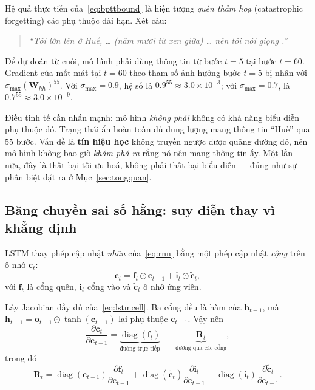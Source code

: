 Hệ quả thực tiễn của~\eqref{eq:bpttbound} là hiện tượng \emph{quên thảm hoạ}
(catastrophic forgetting) các phụ thuộc dài hạn. Xét câu:

\begin{quote}
\itshape
``Tôi lớn lên ở Huế, \ldots{} (năm mươi từ xen giữa) \ldots{} nên tôi nói giọng
\underline{\phantom{Huế}}.''
\end{quote}

Để dự đoán từ cuối, mô hình phải dùng thông tin từ bước $t=5$ tại bước $t=60$.
Gradient của mất mát tại $t=60$ theo tham số ảnh hưởng bước $t=5$ bị nhân với
$\sigma_{\max}(\mathbf{W}_{hh})^{55}$. Với $\sigma_{\max} = 0.9$, hệ số là
$0.9^{55}\approx 3.0\times10^{-3}$; với $\sigma_{\max} = 0.7$, là
$0.7^{55}\approx 3.0\times10^{-9}$.

Điều tinh tế cần nhấn mạnh: mô hình \emph{không phải} không có khả năng biểu diễn
phụ thuộc đó. Trạng thái ẩn hoàn toàn đủ dung lượng mang thông tin ``Huế'' qua
$55$ bước. Vấn đề là \textbf{tín hiệu học} không truyền ngược được quãng đường đó,
nên mô hình không bao giờ \emph{khám phá ra} rằng nó nên mang thông tin ấy. Một
lần nữa, đây là thất bại tối ưu hoá, không phải thất bại biểu diễn --- đúng như
sự phân biệt đặt ra ở Mục~\ref{sec:tongquan}.

\subsection{Băng chuyền sai số hằng: suy diễn thay vì khẳng định}

LSTM thay phép cập nhật \emph{nhân} của~\eqref{eq:rnn} bằng một phép cập nhật
\emph{cộng} trên ô nhớ $\mathbf{c}_t$:
\begin{equation}
  \mathbf{c}_t
  = \mathbf{f}_t \odot \mathbf{c}_{t-1}
  + \mathbf{i}_t \odot \tilde{\mathbf{c}}_t ,
  \label{eq:lstmcell}
\end{equation}
với $\mathbf{f}_t$ là cổng quên, $\mathbf{i}_t$ cổng vào và
$\tilde{\mathbf{c}}_t$ ô nhớ ứng viên.

Lấy Jacobian đầy đủ của~\eqref{eq:lstmcell}. Ba cổng đều là hàm của
$\mathbf{h}_{t-1}$, mà $\mathbf{h}_{t-1} = \mathbf{o}_{t-1}\odot
\tanh(\mathbf{c}_{t-1})$ lại phụ thuộc $\mathbf{c}_{t-1}$. Vậy nên
\begin{equation}
  \frac{\partial\mathbf{c}_t}{\partial\mathbf{c}_{t-1}}
  = \underbrace{\operatorname{diag}\!\left(\mathbf{f}_t\right)}_{\text{đường trực tiếp}}
  \;+\;
  \underbrace{\mathbf{R}_t}_{\text{đường qua các cổng}} ,
  \label{eq:lstmjac}
\end{equation}
trong đó
\[
  \mathbf{R}_t
  = \operatorname{diag}\!\left(\mathbf{c}_{t-1}\right)
    \frac{\partial\mathbf{f}_t}{\partial\mathbf{c}_{t-1}}
  + \operatorname{diag}\!\left(\tilde{\mathbf{c}}_t\right)
    \frac{\partial\mathbf{i}_t}{\partial\mathbf{c}_{t-1}}
  + \operatorname{diag}\!\left(\mathbf{i}_t\right)
    \frac{\partial\tilde{\mathbf{c}}_t}{\partial\mathbf{c}_{t-1}} .
\]

